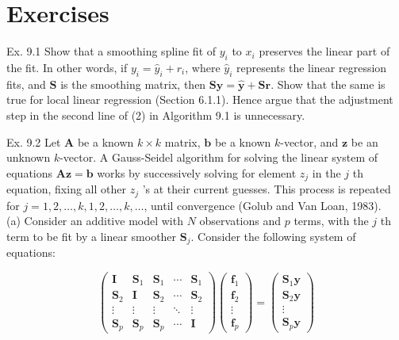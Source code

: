 \documentclass[10pt]{article}
\begin{document}
\section*{Exercises}
Ex. 9.1 Show that a smoothing spline fit of $y_{i}$ to $x_{i}$ preserves the linear part of the fit. In other words, if $y_{i}=\hat{y}_{i}+r_{i}$, where $\hat{y}_{i}$ represents the linear regression fits, and $\mathbf{S}$ is the smoothing matrix, then $\mathbf{S y}=\hat{\mathbf{y}}+\mathbf{S r}$. Show that the same is true for local linear regression (Section 6.1.1). Hence argue that the adjustment step in the second line of (2) in Algorithm 9.1 is unnecessary.

Ex. 9.2 Let $\mathbf{A}$ be a known $k \times k$ matrix, $\mathbf{b}$ be a known $k$-vector, and $\mathbf{z}$ be an unknown $k$-vector. A Gauss-Seidel algorithm for solving the linear system of equations $\mathbf{A z}=\mathbf{b}$ works by successively solving for element $z_{j}$ in the $j$ th equation, fixing all other $z_{j}$ 's at their current guesses. This process is repeated for $j=1,2, \ldots, k, 1,2, \ldots, k, \ldots$, until convergence (Golub and Van Loan, 1983).\\
(a) Consider an additive model with $N$ observations and $p$ terms, with the $j$ th term to be fit by a linear smoother $\mathbf{S}_{j}$. Consider the following system of equations:

\[
\left(\begin{array}{ccccc}
\mathbf{I} & \mathbf{S}_{1} & \mathbf{S}_{1} & \cdots & \mathbf{S}_{1}  \tag{9.33}\\
\mathbf{S}_{2} & \mathbf{I} & \mathbf{S}_{2} & \cdots & \mathbf{S}_{2} \\
\vdots & \vdots & \vdots & \ddots & \vdots \\
\mathbf{S}_{p} & \mathbf{S}_{p} & \mathbf{S}_{p} & \cdots & \mathbf{I}
\end{array}\right)\left(\begin{array}{c}
\mathbf{f}_{1} \\
\mathbf{f}_{2} \\
\vdots \\
\mathbf{f}_{p}
\end{array}\right)=\left(\begin{array}{c}
\mathbf{S}_{1} \mathbf{y} \\
\mathbf{S}_{2} \mathbf{y} \\
\vdots \\
\mathbf{S}_{p} \mathbf{y}
\end{array}\right)
\]
\end{document}
